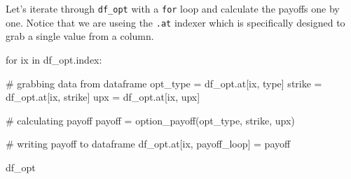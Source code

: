 \documentclass[
  letterpaper,
  DIV=11,
  numbers=noendperiod]{scrreprt}
\newenvironment{Shaded}{\begin{snugshade}}{\end{snugshade}}
\newcommand{\CommentTok}[1]{\textcolor[rgb]{0.37,0.37,0.37}{#1}}
\newcommand{\ControlFlowTok}[1]{\textcolor[rgb]{0.00,0.23,0.31}{#1}}
\newcommand{\KeywordTok}[1]{\textcolor[rgb]{0.00,0.23,0.31}{#1}}
\newcommand{\NormalTok}[1]{\textcolor[rgb]{0.00,0.23,0.31}{#1}}
\newcommand{\OperatorTok}[1]{\textcolor[rgb]{0.37,0.37,0.37}{#1}}
\newcommand{\StringTok}[1]{\textcolor[rgb]{0.13,0.47,0.30}{#1}}
\begin{document}
Let's iterate through \texttt{df\_opt} with a \texttt{for} loop and
calculate the payoffs one by one. Notice that we are useing the
\texttt{.at} indexer which is specifically designed to grab a single
value from a column.

\begin{Shaded}
\begin{Highlighting}[]
\ControlFlowTok{for}\NormalTok{ ix }\KeywordTok{in}\NormalTok{ df\_opt.index:}
    
    \CommentTok{\# grabbing data from dataframe}
\NormalTok{    opt\_type }\OperatorTok{=}\NormalTok{ df\_opt.at[ix, }\StringTok{\textquotesingle{}type\textquotesingle{}}\NormalTok{]}
\NormalTok{    strike }\OperatorTok{=}\NormalTok{ df\_opt.at[ix, }\StringTok{\textquotesingle{}strike\textquotesingle{}}\NormalTok{]}
\NormalTok{    upx }\OperatorTok{=}\NormalTok{ df\_opt.at[ix, }\StringTok{\textquotesingle{}upx\textquotesingle{}}\NormalTok{]}
    
    \CommentTok{\# calculating payoff}
\NormalTok{    payoff }\OperatorTok{=}\NormalTok{ option\_payoff(opt\_type, strike, upx)}
    
    \CommentTok{\# writing payoff to dataframe}
\NormalTok{    df\_opt.at[ix, }\StringTok{\textquotesingle{}payoff\_loop\textquotesingle{}}\NormalTok{] }\OperatorTok{=}\NormalTok{ payoff}
      
\NormalTok{df\_opt}
\end{Highlighting}
\end{Shaded}
\end{document}
